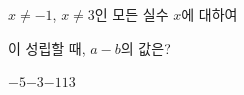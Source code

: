 \hspace*{2mm}\begin{minipage}[t]{\dimexpr\linewidth-2mm\relax}\vspace{0pt}
$x\ne -1$, $x\ne 3$인 모든 실수 $x$에 대하여\par\smallskip{}\par\smallskip\noindent 이 성립할 때, $a-b$의 값은? 
\begin{choices32}{$-5$}{$-3$}{$-1$}{$1$}{$3$}\end{choices32}\end{minipage}
